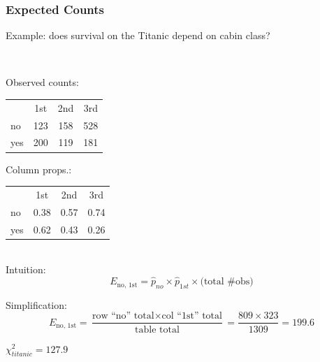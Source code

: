 \documentclass[11pt,containsverbatim,handout,xcolor=xelatex,dvipsnames,table]{beamer}
\begin{document}

\begin{frame}
\frametitle{Expected Counts}

Example: does survival on the Titanic depend on cabin class?

\hfill \\

\begin{minipage}{0.5\textwidth}
Observed counts:
\begin{center}
\begin{tabular}{l c c c}
    & 1st & 2nd & 3rd \\
no  & 123 & 158 & 528 \\
yes & 200 & 119 & 181
\end{tabular}
\end{center}
\end{minipage}%
\begin{minipage}{0.5\textwidth}
Column props.:
\begin{center}
\begin{tabular}{l c c c}
    & 1st & 2nd & 3rd \\
  no  & 0.38 &  0.57 & 0.74 \\
  yes & 0.62 & 0.43 & 0.26
\end{tabular}
\end{center}
\end{minipage}

\pause

\hfill \\

Intuition:
\[
E_{\text{no, 1st}} = \hat p_{no} \times \hat p_{1st} \times \text{(total \# obs)}
\]

Simplification:
\[
E_{\text{no, 1st}} = \frac{\text{row ``no'' total} \times \text{col ``1st'' total}}{\text{table total}} = \frac{809 \times 323}{1309} = 199.6
\]

\pause

$\chi^2_{titanic} = 127.9$

\end{frame}


\end{document}
